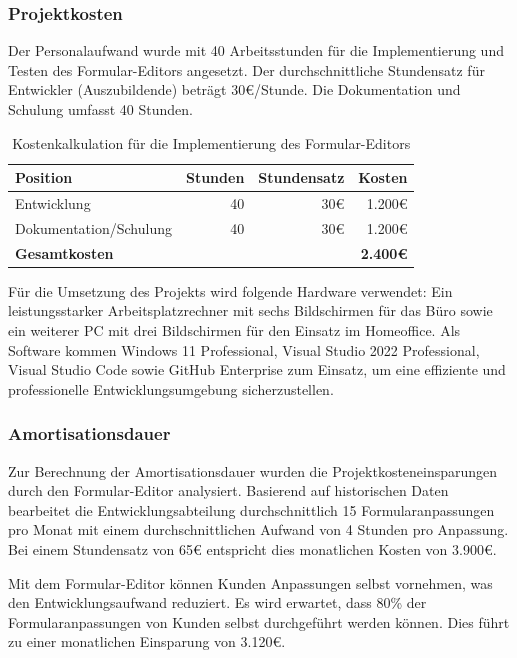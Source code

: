 \documentclass[a4paper,11pt]{article}
\begin{document}
\subsubsection{Projektkosten}
\noindent Der Personalaufwand wurde mit 40 Arbeitsstunden für die Implementierung und Testen des Formular-Editors angesetzt. Der durchschnittliche Stundensatz für Entwickler (Auszubildende) beträgt 30€/Stunde. Die Dokumentation und Schulung umfasst 40 Stunden.

\begin{table}[h]
\centering
\begin{tabular}{lrrr}
\toprule
\textbf{Position} & \textbf{Stunden} & \textbf{Stundensatz} & \textbf{Kosten} \\
\midrule
Entwicklung & 40 & 30€ & 1.200€ \\
Dokumentation/Schulung & 40 & 30€ & 1.200€ \\
\midrule
\textbf{Gesamtkosten} & & & \textbf{2.400€} \\
\bottomrule
\end{tabular}
\caption{Kostenkalkulation für die Implementierung des Formular-Editors}
\end{table}

\noindent Für die Umsetzung des Projekts wird folgende Hardware verwendet: Ein leistungsstarker Arbeitsplatzrechner mit sechs Bildschirmen für das Büro sowie ein weiterer PC mit drei Bildschirmen für den Einsatz im Homeoffice. Als Software kommen Windows 11 Professional, Visual Studio 2022 Professional, Visual Studio Code sowie GitHub Enterprise zum Einsatz, um eine effiziente und professionelle Entwicklungsumgebung sicherzustellen.

\subsubsection{Amortisationsdauer}
Zur Berechnung der Amortisationsdauer wurden die Projektkosteneinsparungen durch den Formular-Editor analysiert. Basierend auf historischen Daten bearbeitet die Entwicklungsabteilung durchschnittlich 15 Formularanpassungen pro Monat mit einem durchschnittlichen Aufwand von 4 Stunden pro Anpassung. Bei einem Stundensatz von 65€ entspricht dies monatlichen Kosten von 3.900€.

\noindent Mit dem Formular-Editor können Kunden Anpassungen selbst vornehmen, was den Entwicklungsaufwand reduziert. Es wird erwartet, dass 80\% der Formularanpassungen von Kunden selbst durchgeführt werden können. Dies führt zu einer monatlichen Einsparung von 3.120€.
\end{document}
